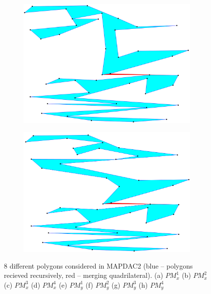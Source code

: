 \documentclass[conference]{IEEEtran}
\begin{document}
\begin{figure}[htbp]
			\begin{subfigure}{0.45\linewidth}
				\centering
				\includegraphics[width=0.99\textwidth]{fig1g.png}
				\caption{}
				\label{fig1g}
			\end{subfigure}
			\begin{subfigure}{0.45\linewidth}
				\centering
				\includegraphics[width=0.99\textwidth]{fig1h.png}
				\caption{}
				\label{fig1h}
			\end{subfigure}
			
			\caption
			{
				8 different polygons considered in MAP{\textunderscore}DAC2 (blue -- polygons recieved recursively, red -- merging quadrilateral).
				(a) $PM_{x}^{1}$
				(b) $PM_{x}^{2}$
				(c) $PM_{x}^{3}$
				(d) $PM_{x}^{4}$
				(e) $PM_{y}^{1}$
				(f) $PM_{y}^{2}$
				(g) $PM_{y}^{3}$
				(h) $PM_{y}^{4}$
			}
			\label{fig1}
		\end{figure}
		
\end{document}
